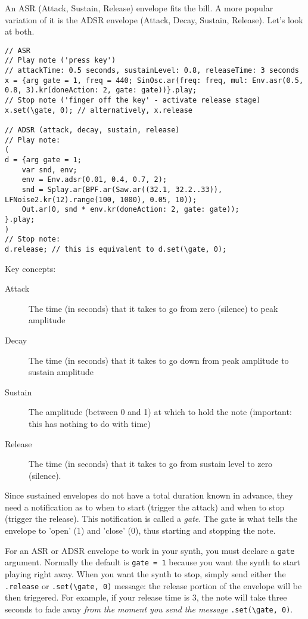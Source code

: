 An ASR (Attack, Sustain, Release) envelope fits the bill. A more popular variation of it is the ADSR envelope (Attack, Decay, Sustain, Release). Let's look at both.

 
\begin{lstlisting}[style=SuperCollider-IDE, basicstyle=\scttfamily\footnotesize]
// ASR
// Play note ('press key')
// attackTime: 0.5 seconds, sustainLevel: 0.8, releaseTime: 3 seconds
x = {arg gate = 1, freq = 440; SinOsc.ar(freq: freq, mul: Env.asr(0.5, 0.8, 3).kr(doneAction: 2, gate: gate))}.play;
// Stop note ('finger off the key' - activate release stage)
x.set(\gate, 0); // alternatively, x.release

// ADSR (attack, decay, sustain, release)
// Play note:
(
d = {arg gate = 1;
	var snd, env;
	env = Env.adsr(0.01, 0.4, 0.7, 2);
	snd = Splay.ar(BPF.ar(Saw.ar((32.1, 32.2..33)), LFNoise2.kr(12).range(100, 1000), 0.05, 10));
	Out.ar(0, snd * env.kr(doneAction: 2, gate: gate));
}.play;
)
// Stop note:
d.release; // this is equivalent to d.set(\gate, 0);
\end{lstlisting}
 

Key concepts:

\begin{description}
\item[Attack] The time (in seconds) that it takes to go from zero (silence) to peak amplitude
\item[Decay] The time (in seconds) that it takes to go down from peak amplitude to sustain amplitude
\item[Sustain] The amplitude (between 0 and 1) at which to hold the note (important: this has nothing to do with time)
\item[Release] The time (in seconds) that it takes to go from sustain level to zero (silence).
\end{description}

Since sustained envelopes do not have a total duration known in advance, they need a notification as to when to start (trigger the attack) and when to stop (trigger the release). This notification is called a \emph{gate}. The gate is what tells the envelope to 'open' (1) and 'close' (0), thus starting and stopping the note.

For an ASR or ADSR envelope to work in your synth, you must declare a \texttt{gate} argument. Normally the default is \texttt{gate = 1} because you want the synth to start playing right away. When you want the synth to stop, simply send either the \texttt{.release} or \texttt{.set(\textbackslash gate, 0)} message: the release portion of the envelope will be then triggered. For example, if your release time is 3, the note will take three seconds to fade away \emph{from the moment you send the message} \texttt{.set(\textbackslash gate, 0)}.